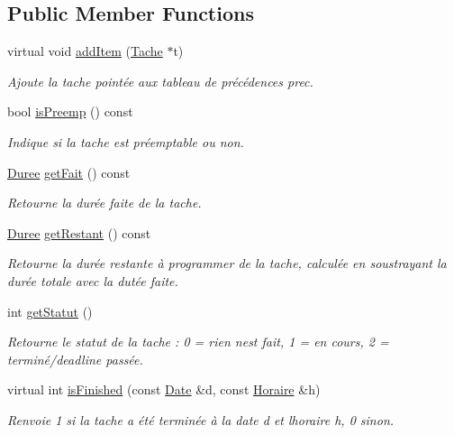 \subsection*{Public Member Functions}
\begin{DoxyCompactItemize}
\item 
virtual void \hyperlink{class_unitaire_a804454c39eb010aa67bd622a009df840}{add\+Item} (\hyperlink{class_tache}{Tache} $\ast$t)
\begin{DoxyCompactList}\small\item\em Ajoute la tache pointée aux tableau de précédences prec. \end{DoxyCompactList}\item 
bool \hyperlink{class_unitaire_adba3a8de0fe6273cea7eecda3520bfcd}{is\+Preemp} () const 
\begin{DoxyCompactList}\small\item\em Indique si la tache est préemptable ou non. \end{DoxyCompactList}\item 
\hyperlink{class_t_i_m_e_1_1_duree}{Duree} \hyperlink{class_unitaire_a9ab243102aa0572048a956204532b201}{get\+Fait} () const 
\begin{DoxyCompactList}\small\item\em Retourne la durée faite de la tache. \end{DoxyCompactList}\item 
\hyperlink{class_t_i_m_e_1_1_duree}{Duree} \hyperlink{class_unitaire_a2fa3fa1073200a18c9a2706b37eb78e6}{get\+Restant} () const 
\begin{DoxyCompactList}\small\item\em Retourne la durée restante à programmer de la tache, calculée en soustrayant la durée totale avec la dutée faite. \end{DoxyCompactList}\item 
int \hyperlink{class_unitaire_aadf6c5718aff37f1a7589240059e9e98}{get\+Statut} ()
\begin{DoxyCompactList}\small\item\em Retourne le statut de la tache \+: 0 = rien n\textquotesingle{}est fait, 1 = en cours, 2 = terminé/deadline passée. \end{DoxyCompactList}\item 
virtual int \hyperlink{class_unitaire_affee1a6cda05a1032eba560196af99b9}{is\+Finished} (const \hyperlink{class_t_i_m_e_1_1_date}{Date} \&d, const \hyperlink{class_t_i_m_e_1_1_horaire}{Horaire} \&h)
\begin{DoxyCompactList}\small\item\em Renvoie 1 si la tache a été terminée à la date d et l\textquotesingle{}horaire h, 0 sinon. \end{DoxyCompactList}\item 

\end{DoxyCompactItemize}
